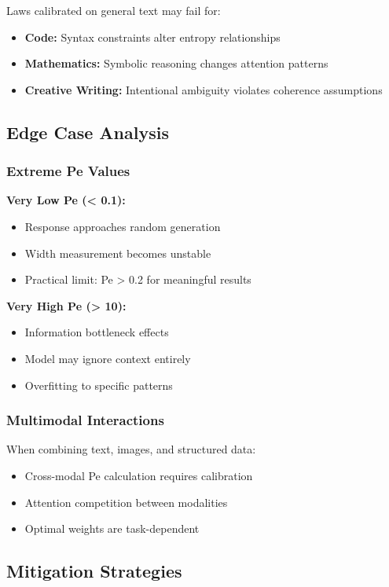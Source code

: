 \documentclass[conference]{IEEEtran}
\begin{document}
Laws calibrated on general text may fail for:
\begin{itemize}
\item \textbf{Code:} Syntax constraints alter entropy relationships
\item \textbf{Mathematics:} Symbolic reasoning changes attention patterns
\item \textbf{Creative Writing:} Intentional ambiguity violates coherence assumptions
\end{itemize}

\subsection{Edge Case Analysis}

\subsubsection{Extreme Pe Values}

\textbf{Very Low Pe (< 0.1):}
\begin{itemize}
\item Response approaches random generation
\item Width measurement becomes unstable
\item Practical limit: Pe > 0.2 for meaningful results
\end{itemize}

\textbf{Very High Pe (> 10):}
\begin{itemize}
\item Information bottleneck effects
\item Model may ignore context entirely
\item Overfitting to specific patterns
\end{itemize}

\subsubsection{Multimodal Interactions}

When combining text, images, and structured data:
\begin{itemize}
\item Cross-modal Pe calculation requires calibration
\item Attention competition between modalities
\item Optimal weights are task-dependent
\end{itemize}

\subsection{Mitigation Strategies}
\end{document}
